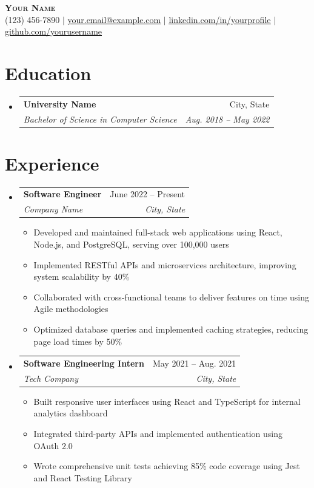 \documentclass[letterpaper,11pt]{article}
\makeatletter
\newcommand{\resumeItem}[1]{
  \item\small{
    {#1 \vspace{-2pt}}
  }
}
\newcommand{\resumeSubheading}[4]{
  \vspace{-1pt}\item
    \begin{tabular*}{0.97\textwidth}[t]{l@{\extracolsep{\fill}}r}
      \textbf{#1} & #2 \\
      \textit{\small#3} & \textit{\small #4} \\
    \end{tabular*}\vspace{-7pt}
}
\newcommand{\resumeSubHeadingListStart}{\begin{itemize}[leftmargin=0.15in, label={}]}
\newcommand{\resumeSubHeadingListEnd}{\end{itemize}}
\newcommand{\resumeItemListStart}{\begin{itemize}}
\newcommand{\resumeItemListEnd}{\end{itemize}\vspace{-5pt}}
\makeatother
\begin{document}
\begin{center}
    \textbf{\Huge \scshape Your Name} \\ \vspace{1pt}
    \small (123) 456-7890 $|$ \href{mailto:your.email@example.com}{\underline{your.email@example.com}} $|$
    \href{https://linkedin.com/in/yourprofile}{\underline{linkedin.com/in/yourprofile}} $|$
    \href{https://github.com/yourusername}{\underline{github.com/yourusername}}
\end{center}

\section{Education}
  \resumeSubHeadingListStart
    \resumeSubheading
      {University Name}{City, State}
      {Bachelor of Science in Computer Science}{Aug. 2018 -- May 2022}
  \resumeSubHeadingListEnd

\section{Experience}
  \resumeSubHeadingListStart

    \resumeSubheading
      {Software Engineer}{June 2022 -- Present}
      {Company Name}{City, State}
      \resumeItemListStart
        \resumeItem{Developed and maintained full-stack web applications using React, Node.js, and PostgreSQL, serving over 100,000 users}
        \resumeItem{Implemented RESTful APIs and microservices architecture, improving system scalability by 40\%}
        \resumeItem{Collaborated with cross-functional teams to deliver features on time using Agile methodologies}
        \resumeItem{Optimized database queries and implemented caching strategies, reducing page load times by 50\%}
      \resumeItemListEnd

    \resumeSubheading
      {Software Engineering Intern}{May 2021 -- Aug. 2021}
      {Tech Company}{City, State}
      \resumeItemListStart
        \resumeItem{Built responsive user interfaces using React and TypeScript for internal analytics dashboard}
        \resumeItem{Integrated third-party APIs and implemented authentication using OAuth 2.0}
        \resumeItem{Wrote comprehensive unit tests achieving 85\% code coverage using Jest and React Testing Library}
    \resumeItemListEnd

  \resumeSubHeadingListEnd
\end{document}
